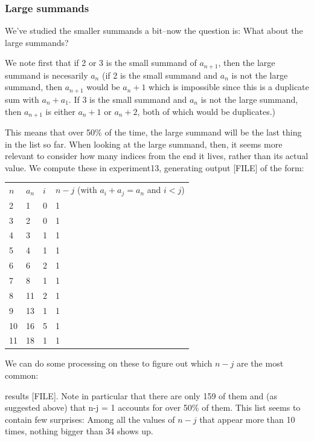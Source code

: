 \documentclass{article}
\theoremstyle{definition}
\theoremstyle{remark}
\numberwithin{equation}{section}
\begin{document}
\subsubsection{Large summands}

We've studied the smaller summands a bit--now the question is: What
about the large summands?

We note first that if 2 or 3 is the small summand of $a_{n+1}$, then
the large summand is necesarily $a_n$ (if 2 is the small summand and
$a_n$ is not the large summand, then $a_{n+1}$ would be $a_n + 1$
which is impossible since this is a duplicate sum with $a_n+a_1$.  If
3 is the small summand and $a_n$ is not the large summand, then
$a_{n+1}$ is either $a_n + 1$ or $a_n + 2$, both of which would be
duplicates.)

This means that over 50\% of the time, the large summand will be the
last thing in the list so far.  When looking at the large summand,
then, it seems more relevant to consider how many indices from the end
it lives, rather than its actual value.  We compute these in
experiment13, generating output [FILE] of the form:

\begin{tabular}{|l|l|l|l|}
$n$ 	&$a_n$	&$i$	&$n-j$ (with $a_i + a_j = a_n$ and $i < j$)\\
2 	&1 	&0 	&1\\
3 	&2 	&0 	&1\\
4 	&3 	&1 	&1\\
5 	&4 	&1 	&1\\
6 	&6 	&2 	&1\\
7 	&8 	&1 	&1\\
8 	&11 	&2 	&1\\
9 	&13 	&1 	&1\\
10 	&16 	&5 	&1\\
11 	&18 	&1 	&1
\end{tabular}

We can do some processing on these to figure out which $n-j$ are the
most common:


results [FILE].  Note in particular that there are only 159 of them
and (as suggested above) that n-j = 1 accounts for over 50\% of them.
This list seems to contain few surprises: Among all the values of $n-j$
that appear more than 10 times, nothing bigger than 34 shows up.
\end{document}
